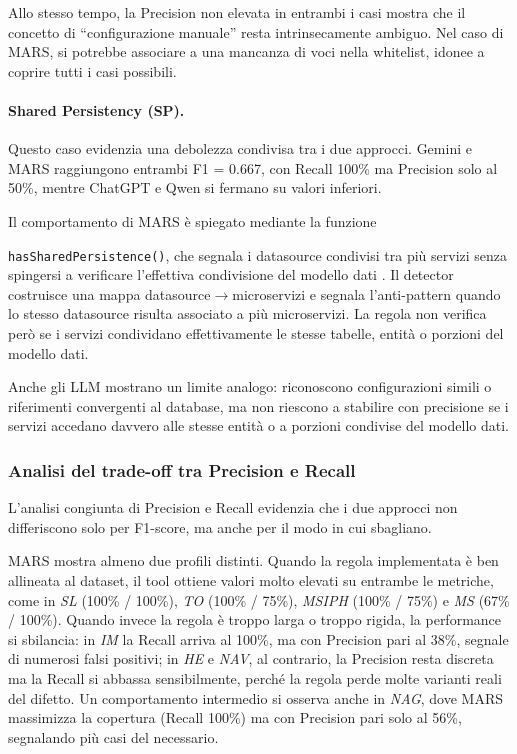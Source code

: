 Allo stesso tempo, la Precision non elevata in entrambi i casi mostra che il concetto di “configurazione manuale” resta intrinsecamente ambiguo. Nel caso di MARS, si potrebbe associare a una mancanza di voci nella whitelist, idonee a coprire tutti i casi possibili.

\paragraph{Shared Persistency (SP).}
Questo caso evidenzia una debolezza condivisa tra i due approcci. Gemini e MARS raggiungono entrambi F1 = 0.667, con Recall 100\% ma Precision solo al 50\%, mentre ChatGPT e Qwen si fermano su valori inferiori. 

Il comportamento di MARS 
è spiegato mediante la funzione 

\texttt{hasSharedPersistence()}, che segnala i datasource condivisi tra più servizi senza spingersi a verificare l'effettiva condivisione del modello dati \cite{MARS, madern2024_mars}. Il detector costruisce una mappa datasource$\rightarrow$microservizi e segnala l'anti-pattern quando lo stesso datasource risulta associato a più microservizi. La regola non verifica però se i servizi condividano effettivamente le stesse tabelle, entità o porzioni del modello dati.

Anche gli LLM mostrano un limite analogo: riconoscono configurazioni simili o riferimenti convergenti al database, ma non riescono a stabilire con precisione se i servizi accedano davvero alle stesse entità o a porzioni condivise del modello dati. 





\subsubsection*{Analisi del trade-off tra Precision e Recall}

L’analisi congiunta di Precision e Recall evidenzia che i due approcci non differiscono solo per F1-score, ma anche per il modo in cui sbagliano.

MARS mostra almeno due profili distinti. Quando la regola implementata è ben allineata al dataset, il tool ottiene valori molto elevati su entrambe le metriche, come in \textit{SL} (100\% / 100\%), \textit{TO} (100\% / 75\%), \textit{MSIPH} (100\% / 75\%) e \textit{MS} (67\% / 100\%). Quando invece la regola è troppo larga o troppo rigida, la performance si sbilancia: in \textit{IM} la Recall arriva al 100\%, ma con Precision pari al 38\%, segnale di numerosi falsi positivi; in \textit{HE} e \textit{NAV}, al contrario, la Precision resta discreta ma la Recall si abbassa sensibilmente, perché la regola perde molte varianti reali del difetto. Un comportamento intermedio si osserva anche in \textit{NAG}, dove MARS massimizza la copertura (Recall 100\%) ma con Precision pari solo al 56\%, segnalando più casi del necessario.

